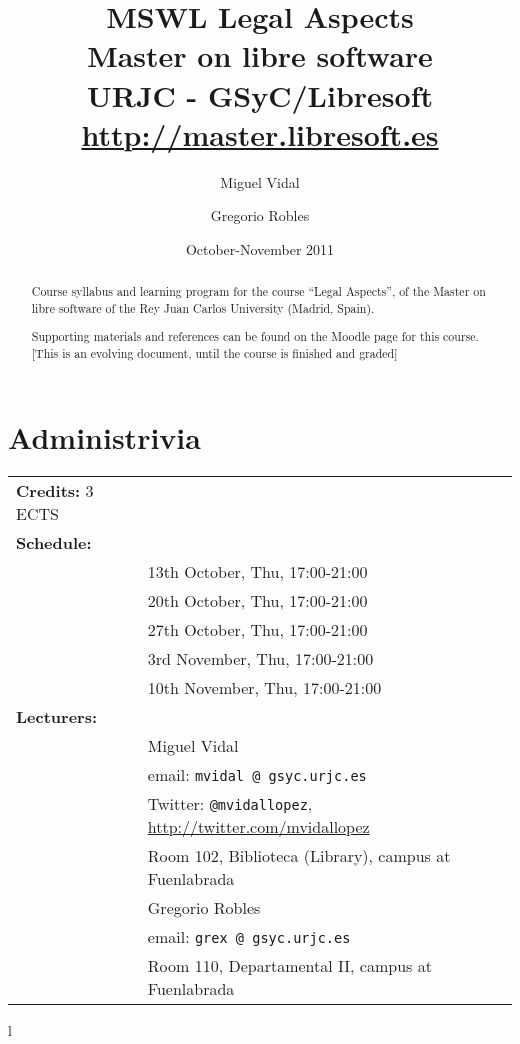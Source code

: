 \documentclass[a4paper]{article}
\title{MSWL Legal Aspects \\
Master on libre software \\
URJC - GSyC/Libresoft \\
\url{http://master.libresoft.es}}
\author{Miguel Vidal \and Gregorio Robles}
\date{October-November 2011}
\begin{document}
\maketitle

\begin{abstract}
Course syllabus and learning program for the course ``Legal Aspects'', 
of the Master on libre software of the Rey Juan Carlos University (Madrid, Spain). 

Supporting materials and references can be found on the Moodle page for this course. \\

[This is an evolving document, until the course is finished and graded]
\end{abstract}

\tableofcontents

\section{Administrivia}

\begin{tabular}{ll}
\textbf{Credits:} 3 ECTS \\
\textbf{Schedule:} \\
& 13th October, Thu, 17:00-21:00 \\
& 20th October, Thu, 17:00-21:00 \\
& 27th October, Thu, 17:00-21:00 \\
& 3rd November, Thu, 17:00-21:00 \\
& 10th November, Thu, 17:00-21:00 \\
\textbf{Lecturers:} \\
& Miguel Vidal \\
& \hspace{1cm} email: \texttt{mvidal @ gsyc.urjc.es} \\
& \hspace{1cm} Twitter: \texttt{@mvidallopez}, \url{http://twitter.com/mvidallopez} \\
& \hspace{1cm} Room 102, Biblioteca (Library), campus at Fuenlabrada \\
& Gregorio Robles \\
& \hspace{1cm} email: \texttt{grex @ gsyc.urjc.es} \\
& \hspace{1cm} Room 110, Departamental II, campus at Fuenlabrada \\
\end{tabular}{l}
\end{document}
